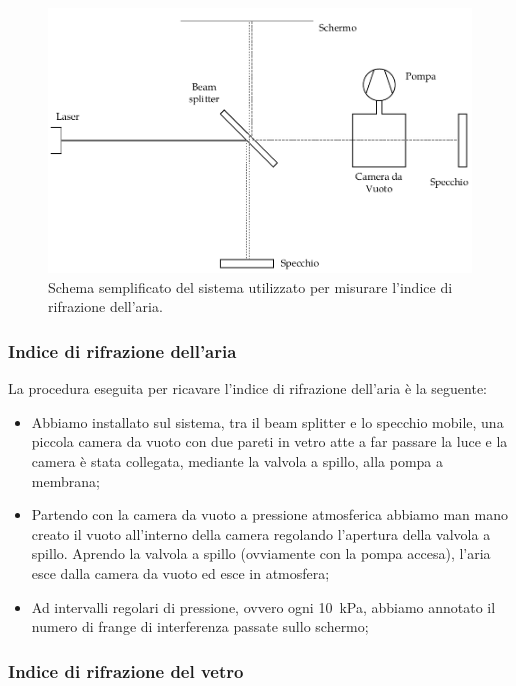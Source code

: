 

\begin{figure}
    \centering
    \includegraphics[width=120mm]{drawing.pdf}
    \caption{Schema semplificato del sistema utilizzato per misurare l'indice di rifrazione dell'aria.}
    \label{fig:mik}
\end{figure}

\subsubsection{Indice di rifrazione dell'aria}

La procedura eseguita per ricavare l'indice di rifrazione dell'aria è la seguente:

\begin{itemize}
	\item{Abbiamo installato sul sistema, tra il beam splitter e lo specchio mobile, una piccola camera da vuoto con due pareti in vetro atte a far passare la luce %
	 e la camera è stata collegata, mediante la valvola a spillo, alla pompa a membrana;}
    \item{Partendo con la camera da vuoto a pressione atmosferica abbiamo man mano creato il vuoto all'interno della camera regolando l'apertura della valvola a spillo. Aprendo la valvola a spillo (ovviamente con la pompa accesa), l'aria esce dalla camera da vuoto ed esce in atmosfera;}
    \item{Ad intervalli regolari di pressione, ovvero ogni \SI{10}{\kilo\pascal}, abbiamo annotato il numero di frange di interferenza passate sullo schermo;}
\end{itemize}

\subsubsection{Indice di rifrazione del vetro}

